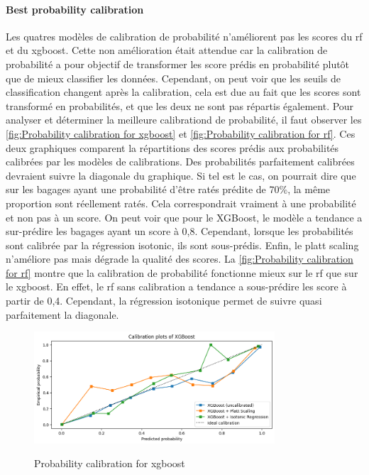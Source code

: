 \documentclass[12pt]{article}
\begin{document}
\paragraph{Best probability calibration} Les quatres modèles de calibration de probabilité n'améliorent pas les scores du \acrshort{rf} et du \acrshort{xgboost}. Cette non amélioration était attendue car la calibration de probabilité a pour objectif de transformer les score prédis en probabilité plutôt que de mieux classifier les données. Cependant, on peut voir que les seuils de classification changent après la calibration, cela est due au fait que les scores sont transformé en probabilités, et que les deux ne sont pas répartis également. Pour analyser et déterminer la meilleure calibrationd de probabilité, il faut observer les \autoref{fig:Probability calibration for xgboost} et \autoref{fig:Probability calibration for rf}. 
Ces deux graphiques comparent la répartitions des scores prédis aux probabilités calibrées par les modèles de calibrations. Des probabilités parfaitement calibrées devraient suivre la diagonale du graphique. Si tel est le cas, on pourrait dire que sur les bagages ayant une probabilité d'être ratés prédite de 70\%, la même proportion sont réellement ratés. Cela correspondrait vraiment à une probabilité et non pas à un score. 
On peut voir que pour le XGBoost, le modèle a tendance a sur-prédire les bagages ayant un score à 0,8. Cependant, lorsque les probabilités sont calibrée par la régression isotonic, ils sont sous-prédis. Enfin, le platt scaling n'améliore pas mais dégrade la qualité des scores.
La \autoref{fig:Probability calibration for rf} montre que la calibration de probabilité fonctionne mieux sur le \acrshort{rf} que sur le \acrshort{xgboost}. En effet, le \acrshort{rf} sans calibration a tendance a sous-prédire les score à partir de 0,4. Cependant, la régression isotonique permet de suivre quasi parfaitement la diagonale.


\FloatBarrier
\begin{figure}[h]
    \centering
    \includegraphics[width=0.8\textwidth]{Calibration_plot_XGBOOST.png}\\
    \caption{Probability calibration for \acrshort{xgboost}}
    \label{fig:Probability calibration for xgboost}
\end{figure}
\FloatBarrier
\end{document}
